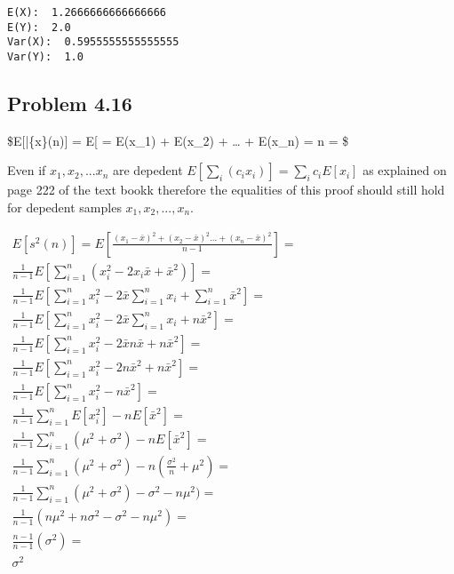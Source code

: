 \documentclass[11pt]{article}
\begin{document}
    \begin{Verbatim}[commandchars=\\\{\}]
E(X):  1.2666666666666666
E(Y):  2.0
Var(X):  0.5955555555555555
Var(Y):  1.0

    \end{Verbatim}

    \hypertarget{problem-4.16}{%
\subsection{Problem 4.16}\label{problem-4.16}}

\$E{[}\bar\{x\}(n){]} = E{[}\frac{x_1 + x_2 + ... + x_n}{n}{]} =
E(x\_1) + E(x\_2) + \ldots{} + E(x\_n) =  n \mu =
\mu \$

Even if \(x_1, x_2, ... x_n\) are depedent
\(E[\sum_i (c_ix_i)] = \sum_i c_iE[x_i]\) as explained on page 222 of
the text bookk therefore the equalities of this proof should still hold
for depedent samples \(x_1, x_2, ..., x_n\).

\(\begin{gather*}E[s^2(n)] = E[\frac{(x_1 - \bar{x})^2 + (x_2 - \bar{x})^2 ... + (x_n - \bar{x})^2}{n-1}] = \\ \frac{1}{n-1}E[\sum_{i = 1} ^ n (x_i^2 - 2x_i\bar{x} +\bar{x}^2)] =\\ \frac{1}{n-1}E[\sum_{i = 1} ^ nx_i^2 - 2\bar{x}\sum_{i = 1} ^ nx_i + \sum_{i = 1} ^ n\bar{x}^2] =\\ \frac{1}{n-1}E[\sum_{i = 1} ^ nx_i^2 - 2\bar{x}\sum_{i = 1} ^ nx_i + n\bar{x}^2] = \\ \frac{1}{n-1}E[\sum_{i = 1} ^ nx_i^2 - 2\bar{x}n\bar{x} + n\bar{x}^2] =\\ \frac{1}{n-1}E[\sum_{i = 1} ^ nx_i^2 - 2n\bar{x}^2 + n\bar{x}^2] =\\ \frac{1}{n-1}E[\sum_{i = 1} ^ nx_i^2 - n\bar{x}^2] =\\ \frac{1}{n-1}\sum_{i = 1} ^ n E[x_i^2] - nE[\bar{x}^2]= \\ \frac{1}{n-1}\sum_{i = 1} ^ n (\mu^2 + \sigma^2) - nE[\bar{x}^2]=\\ \frac{1}{n-1}\sum_{i = 1} ^ n (\mu^2 + \sigma^2) - n(\frac{\sigma^2}{n} + \mu^2)=\\ \frac{1}{n-1}\sum_{i = 1} ^ n (\mu^2 + \sigma^2) - \sigma^2 - n\mu^2)=\\ \frac{1}{n-1}(n\mu^2 + n\sigma^2 - \sigma^2 - n\mu^2)=\\ \frac{n-1}{n-1}(\sigma^2) = \\ \sigma^2 \end{gather*}\)
\end{document}
